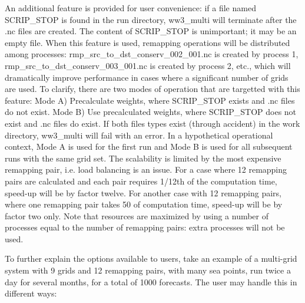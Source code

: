 An additional feature is provided for user convenience: if a file named {\file
  SCRIP\_STOP} is found in the run directory, {\file ww3\_multi} will
terminate after the {\file .nc} files are created. The content of {\file
  SCRIP\_STOP} is unimportant; it may be an empty file. When this feature is
used, remapping operations will be distributed among processes: {\file
  rmp\_src\_to\_dst\_conserv\_002\_001.nc} is created by process 1, {\file
  rmp\_src\_to\_dst\_conserv\_003\_001.nc} is created by process 2, etc.,
which will dramatically improve performance in cases where a significant
number of grids are used. To clarify, there are two modes of operation that are
 targetted with this feature: Mode A) Precalculate weights, where 
{\file SCRIP\_STOP} exists and  {\file .nc} files do not exist. Mode B) Use 
precalculated weights, where {\file SCRIP\_STOP} does not exist and {\file .nc}
 files do exist. If both files types exist (through accident) in the work 
directory, {\file ww3\_multi} will fail with an error. In a hypothetical 
operational context, Mode A is used for the first run and Mode B is used for 
all subsequent runs with the same grid set. The scalability is limited by 
the most expensive remapping pair, i.e. load balancing is an issue. 
For a case where 12 remapping pairs are calculated and each pair requires 
1/12th of the computation time, speed-up will be by factor twelve. For 
another case with 12 remapping pairs, where one remapping pair takes 50%
of computation time, speed-up will be by factor two only. Note that resources
are maximized by using a number of processes equal to the number of remapping
pairs: extra processes will not be used. 

To further explain the options available to users, take an example of a 
multi-grid system with 9 grids and 12 remapping pairs, with many sea points, 
run twice a day for several months, for a total of 1000 forecasts. The user 
may handle this in different ways: 

